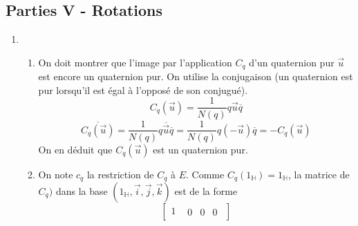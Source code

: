 \subsection*{Parties V - Rotations}
\begin{enumerate}
 \item \begin{enumerate}
 \item On doit montrer que l'image par l'application $C_q$ d'un quaternion pur $\overrightarrow{u}$ est encore un quaternion pur. On utilise la conjugaison (un quaternion est pur lorsqu'il est égal à l'opposé de son conjugué).
\begin{displaymath}
 C_q(\overrightarrow{u}) = \dfrac{1}{N(q)} q \overrightarrow{u} \overline{q}
\end{displaymath}
\begin{displaymath}
\overline{C_q(\overrightarrow{u})} = \dfrac{1}{N(q)} q \overline{\overrightarrow{u}} \overline{q} = \dfrac{1}{N(q)} q (-\overrightarrow{u}) \overline{q} = -C_q(\overrightarrow{u})
\end{displaymath}
On en déduit que $C_q(\overrightarrow{u})$ est un quaternion pur.
\item On note $c_q$ la restriction de $C_q$ à $E$. Comme $C_q(1_{\mathbb H}) = 1_{\mathbb H}$, la matrice de $C_q)$ dans la base $(1_{\mathbb H}, \overrightarrow i,\overrightarrow j,\overrightarrow k)$ est de la forme
\begin{displaymath}
 \begin{bmatrix}
  1 &  
\begin{matrix}
 0 & 0 & 0
\end{matrix}


\end{bmatrix}
\end{displaymath}
\end{enumerate}
\end{enumerate}
